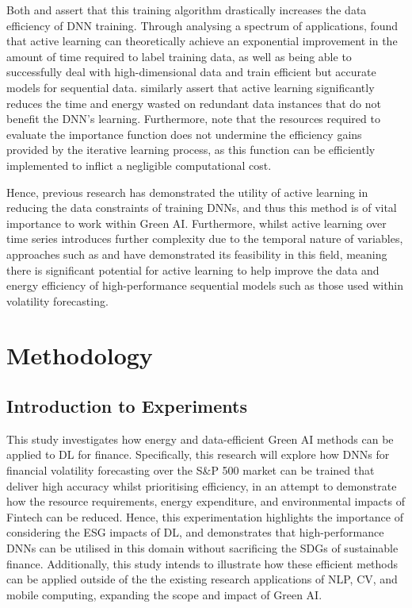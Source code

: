 \documentclass[a4paper, 11pt]{report}
\begin{document}
    Both \citet{ren-2021} and \citet{xu-2021} assert that this training algorithm drastically increases the data efficiency of DNN training. Through analysing a spectrum of applications, \citet{ren-2021} found that active learning can theoretically achieve an exponential improvement in the amount of time required to label training data, as well as being able to successfully deal with high-dimensional data and train efficient but accurate models for sequential data. \citet{xu-2021} similarly assert that active learning significantly reduces the time and energy wasted on redundant data instances that do not benefit the DNN's learning. Furthermore, \citet{ren-2021} note that the resources required to evaluate the importance function does not undermine the efficiency gains provided by the iterative learning process, as this function can be efficiently implemented to inflict a negligible computational cost. 

    Hence, previous research has demonstrated the utility of active learning in reducing the data constraints of training DNNs, and thus this method is of vital importance to work within Green AI. Furthermore, whilst active learning over time series introduces further complexity due to the temporal nature of variables, approaches such as \citet{peng-2017} and \citet{zimmer-2018} have demonstrated its feasibility in this field, meaning there is significant potential for active learning to help improve the data and energy efficiency of high-performance sequential models such as those used within volatility forecasting.


    \newpage
    \chapter{Methodology}
    \label{chapter: experiments}

    \section{Introduction to Experiments}

    This study investigates how energy and data-efficient Green AI methods can be applied to DL for finance. Specifically, this research will explore how DNNs for financial volatility forecasting over the S\&P 500 market can be trained that deliver high accuracy whilst prioritising efficiency, in an attempt to demonstrate how the resource requirements, energy expenditure, and environmental impacts of Fintech can be reduced. Hence, this experimentation highlights the importance of considering the ESG impacts of DL, and demonstrates that high-performance DNNs can be utilised in this domain without sacrificing the SDGs of sustainable finance. Additionally, this study intends to illustrate how these efficient methods can be applied outside of the the existing research applications of NLP, CV, and mobile computing, expanding the scope and impact of Green AI.
\end{document}
